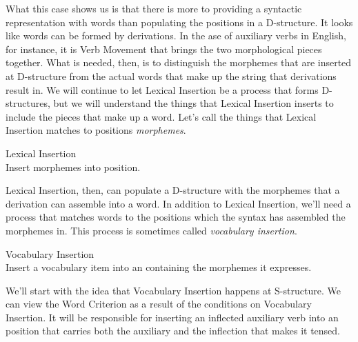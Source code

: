 What this case shows us is that there is more to providing a syntactic representation with words than populating the  positions in a D-structure. It looks like words can be formed by derivations. In the ase of auxiliary verbs in English, for instance, it is Verb Movement that brings the two morphological pieces together. What is needed, then, is to distinguish the morphemes that are inserted at D-structure from the actual words that make up the string that derivations result in. We will continue to let Lexical Insertion be a process that forms D-structures, but we will understand the things that Lexical Insertion inserts to include the pieces that make up a word. Let's call the things that Lexical Insertion matches to  positions \emph{morphemes}.
\begin{exe}
	\ex \label{ex4:LI} Lexical Insertion\\
	Insert morphemes into  position.
\end{exe}
Lexical Insertion, then, can populate a D-structure with the morphemes that a derivation can assemble into a word. In addition to Lexical Insertion, we'll need a process that matches words to the positions which the syntax has assembled the morphemes in. This process is sometimes called \emph{vocabulary insertion}.
\begin{exe}
	\ex \label{ex4:vocabI} Vocabulary Insertion\\
	Insert a vocabulary item into an  containing the morphemes it expresses.
\end{exe}
We'll start with the idea that Vocabulary Insertion happens at S-structure. We can view the Word Criterion as a result of the conditions on Vocabulary Insertion. It will be responsible for inserting an inflected auxiliary verb into an  position that carries both the auxiliary and the inflection that makes it tensed.

